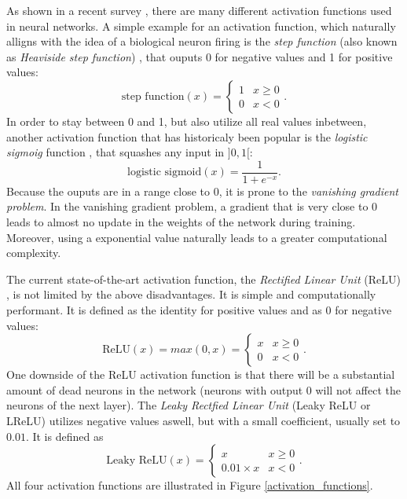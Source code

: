 As shown in a recent survey \cite{activation_functions}, there are many different activation functions used in neural networks. A simple example for an activation function, which naturally alligns with the idea of a biological neuron firing is the \textit{step function} (also known as \textit{Heaviside step function}) \cite{neural_networks_pattern_recognition}, that ouputs 0 for negative values and 1 for positive values:
$$\text{step function}(x) = 
\begin{cases}
    1 & x \geq 0\\
    0 & x < 0
\end{cases}.
$$
In order to stay between 0 and 1, but also utilize all real values inbetween, another activation function that has historicaly been popular is the \textit{logistic sigmoig} function \cite{activation_functions}, that squashes any input in $]0, 1[$:
$$\text{logistic sigmoid}(x) = \frac{1}{1 + e^{-x}}.$$
Because the ouputs are in a range close to 0, it is prone to the \textit{vanishing gradient problem}. In the vanishing gradient problem, a gradient that is very close to 0 leads to almost no update in the weights of the network during training. Moreover, using a exponential value naturally leads to a greater computational complexity. \cite{activation_functions}

The current state-of-the-art activation function, the \textit{Rectified Linear Unit} (ReLU) \cite{activation_functions}, is not limited by the above disadvantages. It is simple and computationally performant. It is defined as the identity for positive values and as 0 for negative values:
$$\text{ReLU}(x) = max(0, x) = 
\begin{cases}
    x & x \geq 0\\
    0 & x < 0
\end{cases}.
$$
One downside of the ReLU activation function is that there will be a substantial amount of dead neurons in the network (neurons with output 0 will not affect the neurons of the next layer). The \textit{Leaky Rectfied Linear Unit} (Leaky ReLU or LReLU) \cite{activation_functions} utilizes negative values aswell, but with a small coefficient, usually set to $0.01$. It is defined as
$$\text{Leaky ReLU}(x) = 
\begin{cases}
    x & x \geq 0\\
    0.01 \times x & x < 0
\end{cases}.
$$
All four activation functions are illustrated in Figure \ref{activation_functions}.

